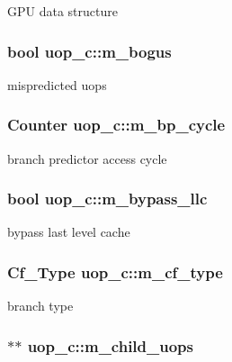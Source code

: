 \label{classuop__c_a8d223e8fbd540bc687ad2243aa4ec2a2}
GPU data structure \hypertarget{classuop__c_a06ee887f6eb340d4a39f317efe4b8118}{
\subsubsection[{m\_\-bogus}]{\setlength{\rightskip}{0pt plus 5cm}bool {\bf uop\_\-c::m\_\-bogus}}}
\label{classuop__c_a06ee887f6eb340d4a39f317efe4b8118}
mispredicted uops \hypertarget{classuop__c_a02da65accb05bbdf6d911ab5916695f3}{
\subsubsection[{m\_\-bp\_\-cycle}]{\setlength{\rightskip}{0pt plus 5cm}Counter {\bf uop\_\-c::m\_\-bp\_\-cycle}}}
\label{classuop__c_a02da65accb05bbdf6d911ab5916695f3}
branch predictor access cycle \hypertarget{classuop__c_ae65d6ef54ceb8fd55c792605e5d79a72}{
\subsubsection[{m\_\-bypass\_\-llc}]{\setlength{\rightskip}{0pt plus 5cm}bool {\bf uop\_\-c::m\_\-bypass\_\-llc}}}
\label{classuop__c_ae65d6ef54ceb8fd55c792605e5d79a72}
bypass last level cache \hypertarget{classuop__c_a96dbe9b75914317162cad8cf8d4bbf1f}{
\subsubsection[{m\_\-cf\_\-type}]{\setlength{\rightskip}{0pt plus 5cm}Cf\_\-Type {\bf uop\_\-c::m\_\-cf\_\-type}}}
\label{classuop__c_a96dbe9b75914317162cad8cf8d4bbf1f}
branch type \hypertarget{classuop__c_a2a5840c5dcfcb176ce0bd09c1e5c1e6b}{
\subsubsection[{m\_\-child\_\-uops}]{$\ast$$\ast$ {\bf uop\_\-c::m\_\-child\_\-uops}}}
